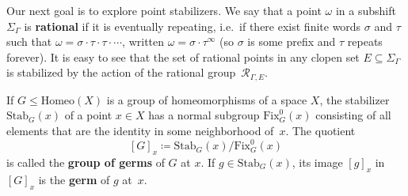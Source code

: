 \documentclass[11pt,letterpaper]{amsart}
\theoremstyle{definition}
\newcommand{\newword}[1]{\textbf{#1}}
\newcommand{\R}{\mathcal{R}}
\newcommand{\Homeo}{\mathrm{Homeo}}
\begin{document}
Our next goal is to explore point stabilizers. We say that a point $\omega$ in a subshift $\Sigma_{\Gamma}$ is \newword{rational} if it is eventually repeating, i.e.\ if there exist finite words $\sigma$ and $\tau$ such that $\omega=\sigma\cdot\tau\cdot\tau\cdot\cdots$, written $\omega=\sigma\cdot \tau^\infty$ (so $\sigma$ is some prefix and $\tau$ repeats forever). It is easy to see that the set of rational points in any clopen set $E\subseteq \Sigma_\Gamma$ is stabilized by the action of the rational group~$\R_{\Gamma,E}$.

If $G\leq \Homeo(X)$ is a group of homeomorphisms of a space $X$, the stabilizer $\mathrm{Stab}_G(x)$ of a point $x\in X$ has a normal subgroup $\mathrm{Fix}_G^0(x)$ consisting of all elements that are the identity in some neighborhood of~$x$.  The quotient
\[
[G]_x \coloneqq \mathrm{Stab}_G(x)\bigr/\mathrm{Fix}_G^0(x)
\]
is called the \newword{group of germs} of $G$ at $x$.  If $g\in \mathrm{Stab}_G(x)$, its image $[g]_x$ in $[G]_x$ is the \newword{germ} of $g$ at~$x$.
\end{document}
